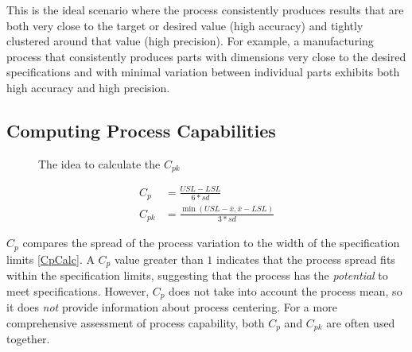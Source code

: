 \documentclass[
  a4paper,
]{scrbook}
\begin{document}
This is the ideal scenario where the process consistently produces
results that are both very close to the target or desired value (high
accuracy) and tightly clustered around that value (high precision). For
example, a manufacturing process that consistently produces parts with
dimensions very close to the desired specifications and with minimal
variation between individual parts exhibits both high accuracy and high
precision.

\newpage{}

\subsection{Computing Process
Capabilities}\label{computing-process-capabilities}

\begin{figure}[ht]


\caption{\label{fig-calc-cpk}The idea to calculate the \(C_{pk}\)}

\end{figure}%

\begin{align}
C_{p} &= \frac{USL-LSL}{6*sd} \label{CpCalc} \\
C_{pk} &= \frac{\min(USL-\bar{x},\bar{x}-LSL)}{3*sd} \label{CpkCalc}
\end{align}

\(C_p\) compares the spread of the process variation to the width of the
specification limits \eqref{CpCalc}. A \(C_p\) value greater than \(1\)
indicates that the process spread fits within the specification limits,
suggesting that the process has the \emph{potential} to meet
specifications. However, \(C_p\) does not take into account the process
mean, so it does \emph{not} provide information about process centering.
For a more comprehensive assessment of process capability, both \(C_p\)
and \(C_{pk}\) are often used together.
\end{document}
